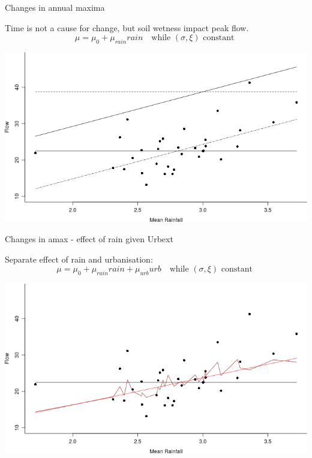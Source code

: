\documentclass[
  10pt,
  ignorenonframetext,
  compress]{beamer}
\begin{document}
\begin{frame}{Changes in annual maxima}
\protect\hypertarget{changes-in-annual-maxima-1}{}

Time is not a cause for change, but soil wetness impact peak flow.\\
\[\mu=\mu_0 + \mu_{rain} rain \quad \text{while } (\sigma, \xi)  \text{ constant }\]

\vspace{-1.0cm}

\includegraphics{ProsdocimiPerugia_files/figure-beamer/rainRetPlot-1.png}

\end{frame}

\begin{frame}{Changes in amax - effect of rain given Urbext}
\protect\hypertarget{changes-in-amax---effect-of-rain-given-urbext}{}

Separate effect of rain and urbanisation:\\
\vspace{-0.4cm}
\[\mu=\mu_0 + \mu_{rain} rain + \mu_{urb} urb \quad \text{while } (\sigma, \xi)  \text{ constant }\]
\vspace{-1.0cm}

\includegraphics{ProsdocimiPerugia_files/figure-beamer/rainGivenUrbRetPlot-1.png}

\end{frame}
\end{document}
